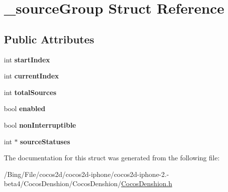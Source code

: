\hypertarget{struct__source_group}{\section{\-\_\-source\-Group Struct Reference}
\label{struct__source_group}
}
\subsection*{Public Attributes}
\begin{DoxyCompactItemize}
\item 
\hypertarget{struct__source_group_aedf60c32c9f50907a1d7c4ceffebd34a}{int {\bfseries start\-Index}}\label{struct__source_group_aedf60c32c9f50907a1d7c4ceffebd34a}

\item 
\hypertarget{struct__source_group_ac8d629bee48fa95ffe085739c29c8393}{int {\bfseries current\-Index}}\label{struct__source_group_ac8d629bee48fa95ffe085739c29c8393}

\item 
\hypertarget{struct__source_group_af92866596e1c52d38901abb5986f1404}{int {\bfseries total\-Sources}}\label{struct__source_group_af92866596e1c52d38901abb5986f1404}

\item 
\hypertarget{struct__source_group_af41ac2109bf5383ea0c7e2816553055f}{bool {\bfseries enabled}}\label{struct__source_group_af41ac2109bf5383ea0c7e2816553055f}

\item 
\hypertarget{struct__source_group_a31063e653ba9ea9e93ba48131c704b4d}{bool {\bfseries non\-Interruptible}}\label{struct__source_group_a31063e653ba9ea9e93ba48131c704b4d}

\item 
\hypertarget{struct__source_group_a5d8722f751c1d2bfd47232307d6ba18c}{int $\ast$ {\bfseries source\-Statuses}}\label{struct__source_group_a5d8722f751c1d2bfd47232307d6ba18c}

\end{DoxyCompactItemize}


The documentation for this struct was generated from the following file\-:\begin{DoxyCompactItemize}
\item 
/\-Bing/\-File/cocos2d/cocos2d-\/iphone/cocos2d-\/iphone-\/2.-\/beta4/\-Cocos\-Denshion/\-Cocos\-Denshion/\hyperlink{_cocos_denshion_8h}{Cocos\-Denshion.\-h}\end{DoxyCompactItemize}
